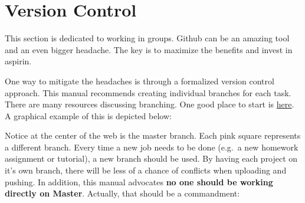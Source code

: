 \documentclass[
]{article}
\begin{document}
\hypertarget{version-control-1}{%
\section{Version Control}\label{version-control-1}}

This section is dedicated to working in groups. Github can be an amazing
tool and an even bigger headache. The key is to maximize the benefits
and invest in aspirin.

One way to mitigate the headaches is through a formalized version
control approach. This manual recommends creating individual branches
for each task. There are many resources discussing branching. One good
place to start is
\href{https://thenewstack.io/dont-mess-with-the-master-working-with-branches-in-git-and-github/}{here}.
A graphical example of this is depicted below:

\begin{center}
\end{center}

Notice at the center of the web is the master branch. Each pink square
represents a different branch. Every time a new job needs to be done
(e.g.~a new homework assignment or tutorial), a new branch should be
used. By having each project on it's own branch, there will be less of a
chance of conflicts when uploading and pushing. In addition, this manual
advocates \textbf{no one should be working directly on Master}.
Actually, that should be a commandment:
\end{document}
